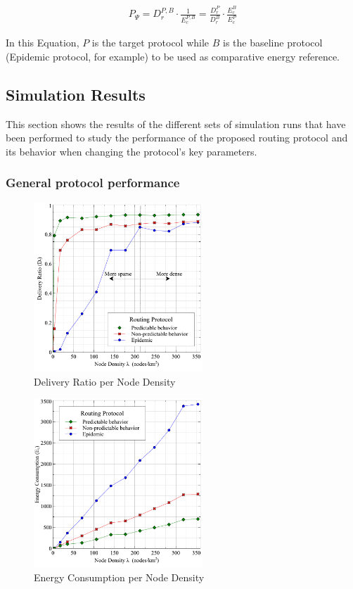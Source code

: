 \begin{eqnarray}
\label{eq:protocol_performance}
{ P }_{ \Psi }= {{ D }_{ r }^{ P,B }} \cdot \frac { 1 }{ { E }_{c}^{ P,B } } 
= \frac {{ D }_{ r }^{ P }}{{ D }_{ r }^{ B } } \cdot \frac{{ E }_{c}^{ B }}{{ E }_{c}^{ P }}
\end{eqnarray}

In this Equation, $P$ is the target protocol while $B$ is the baseline protocol (Epidemic protocol, for example) to be used as comparative energy reference.

\subsection{Simulation Results}
This section shows the results of the different sets of simulation runs that have been performed to study the performance of the proposed routing protocol and its behavior when changing the protocol's key parameters.
\subsubsection{General protocol performance}

\begin{figure}[!t]
	\centering
	\includegraphics[width=2.5in]{Graphs/DeliveryRatio.pdf}
	\caption{Delivery Ratio per Node Density}
	\label{Delivery Ratio per Node Density}
\end{figure}

\begin{figure}[!t]
	\centering
	\includegraphics[width=2.5in]{Graphs/EnergyConsumption.pdf}
	\caption{Energy Consumption per Node Density}
	\label{Energy Consumption per Node Density}
\end{figure}

